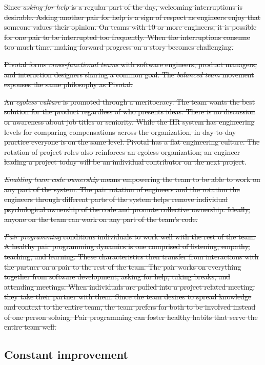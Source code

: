 \sout{Since \textit{asking for help} is a regular part of the day, welcoming interruptions is desirable. Asking another pair for help is a sign of respect as engineers enjoy that someone values their opinion. On teams with 10 or more engineers, it is possible for one pair to be interrupted too frequently. When the interruptions consume too much time, making forward progress on a story becomes challenging. }


\sout{Pivotal forms \textit{cross-functional teams} with software engineers, product managers, and interaction designers sharing a common goal. The \textit{balanced team} movement espouses the same philosophy as Pivotal. }


\sout{An \textit{egoless culture} is promoted through a meritocracy. The team wants the best solution for the product regardless of who presents ideas. There is no discussion or awareness about job titles or seniority. While the HR system has engineering levels for comparing compensations across the organization, in day-to-day practice everyone is on the same level. Pivotal has a flat engineering culture. The rotation of project roles also reinforces an egoless organization; an engineer leading a project today will be an individual contributor on the next project}. 


\sout{\textit{Enabling team code ownership} means empowering the team to be able to work on any part of the system. The pair rotation of engineers and the rotation the engineers through different parts of the system helps remove individual psychological ownership of the code and promote collective ownership. Ideally, anyone on the team can work on any part of the team’s code.}


\sout{\textit{Pair programming} conditions individuals to work well with the rest of the team. A healthy pair programming dynamics is one comprised of listening, empathy, teaching, and learning. These characteristics then transfer from interactions with the partner on a pair to the rest of the team. The pair works on everything together from software development, asking for help, taking breaks, and attending meetings. When individuals are pulled into a project related meeting, they take their partner with them. Since the team desires to spread knowledge and context to the entire team, the team prefers for both to be involved instead of one person soloing. Pair programming can foster healthy habits that serve the entire team well.}


\subsection{Constant improvement}


